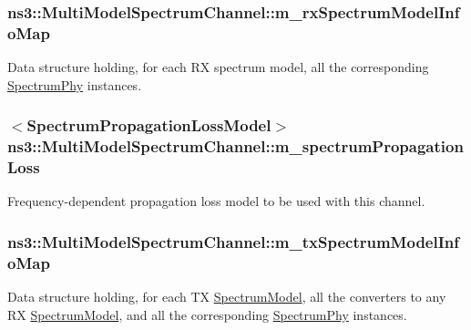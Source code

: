 \subsubsection[{\texorpdfstring{m\+\_\+rx\+Spectrum\+Model\+Info\+Map}{m_rxSpectrumModelInfoMap}}]{ ns3\+::\+Multi\+Model\+Spectrum\+Channel\+::m\+\_\+rx\+Spectrum\+Model\+Info\+Map\hspace{0.3cm}{\ttfamily [private]}}\hypertarget{classns3_1_1MultiModelSpectrumChannel_af75faef47b2e879fd82de7364ac2bcd0}{}\label{classns3_1_1MultiModelSpectrumChannel_af75faef47b2e879fd82de7364ac2bcd0}
Data structure holding, for each RX spectrum model, all the corresponding \hyperlink{classns3_1_1SpectrumPhy}{Spectrum\+Phy} instances. 
\subsubsection[{\texorpdfstring{m\+\_\+spectrum\+Propagation\+Loss}{m_spectrumPropagationLoss}}]{$<${\bf Spectrum\+Propagation\+Loss\+Model}$>$ ns3\+::\+Multi\+Model\+Spectrum\+Channel\+::m\+\_\+spectrum\+Propagation\+Loss\hspace{0.3cm}{\ttfamily [private]}}\hypertarget{classns3_1_1MultiModelSpectrumChannel_a669cb9c95a0a28cc26473ffea7640eab}{}\label{classns3_1_1MultiModelSpectrumChannel_a669cb9c95a0a28cc26473ffea7640eab}
Frequency-\/dependent propagation loss model to be used with this channel. 
\subsubsection[{\texorpdfstring{m\+\_\+tx\+Spectrum\+Model\+Info\+Map}{m_txSpectrumModelInfoMap}}]{ ns3\+::\+Multi\+Model\+Spectrum\+Channel\+::m\+\_\+tx\+Spectrum\+Model\+Info\+Map\hspace{0.3cm}{\ttfamily [private]}}\hypertarget{classns3_1_1MultiModelSpectrumChannel_a401a74579865429a5008431e9000a8be}{}\label{classns3_1_1MultiModelSpectrumChannel_a401a74579865429a5008431e9000a8be}
Data structure holding, for each TX \hyperlink{classns3_1_1SpectrumModel}{Spectrum\+Model}, all the converters to any RX \hyperlink{classns3_1_1SpectrumModel}{Spectrum\+Model}, and all the corresponding \hyperlink{classns3_1_1SpectrumPhy}{Spectrum\+Phy} instances. 

